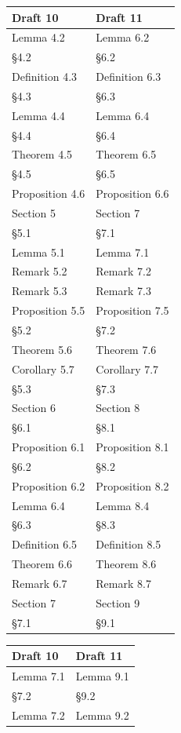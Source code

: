 \documentclass[11pt]{article}
\begin{document}
\begin{center}
\begin{tabular}[t]{@{}ll@{}}
\bottomrule\end{tabular}\hfill
\begin{tabular}[t]{@{}ll@{}}\toprule Draft 10 & Draft 11\\\midrule
Lemma 4.2 & Lemma 6.2\\
\S4.2 & \S6.2\\
Definition 4.3 & Definition 6.3\\
\S4.3 & \S6.3\\
Lemma 4.4 & Lemma 6.4\\
\S4.4 & \S6.4\\
Theorem 4.5 & Theorem 6.5\\
\S4.5 & \S6.5\\
Proposition 4.6 & Proposition 6.6\\
Section 5 & Section 7\\
\S5.1 & \S7.1\\
Lemma 5.1 & Lemma 7.1\\
Remark 5.2 & Remark 7.2\\
Remark 5.3 & Remark 7.3\\
Proposition 5.5 & Proposition 7.5\\
\S5.2 & \S7.2\\
Theorem 5.6 & Theorem 7.6\\
Corollary 5.7 & Corollary 7.7\\
\S5.3 & \S7.3\\
Section 6 & Section 8\\
\S6.1 & \S8.1\\
Proposition 6.1 & Proposition 8.1\\
\S6.2 & \S8.2\\
Proposition 6.2 & Proposition 8.2\\
Lemma 6.4 & Lemma 8.4\\
\S6.3 & \S8.3\\
Definition 6.5 & Definition 8.5\\
Theorem 6.6 & Theorem 8.6\\
Remark 6.7 & Remark 8.7\\
Section 7 & Section 9\\
\S7.1 & \S9.1\\
\bottomrule\end{tabular}\hfill
\begin{tabular}[t]{@{}ll@{}}\toprule Draft 10 & Draft 11\\\midrule
Lemma 7.1 & Lemma 9.1\\
\S7.2 & \S9.2\\
Lemma 7.2 & Lemma 9.2\\

\end{tabular}
\end{center}
\end{document}
